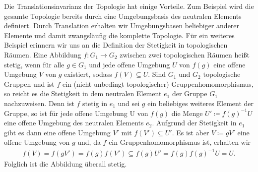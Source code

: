 	Die Translationsinvarianz der Topologie hat einige Vorteile.
	Zum Beispiel wird die gesamte Topologie bereits durch eine Umgebungsbasis des neutralen Elements definiert.
	Durch Translation erhalten wir Umgebungsbasen beliebiger anderer Elemente und damit zwangsläufig die komplette Topologie.
	Für ein weiteres Beispiel erinnern wir uns an die Definition der Stetigkeit in topologischen Räumen.
	Eine Abbildung $f: G_1 \to G_2$ zwischen zwei topologischen Räumen heißt stetig, wenn für alle $g\in G_1$ und jede offene Umgebung $U$ von $f(g)$ eine offene Umgebung $V$ von $g$ existiert, sodass $f(V)\subseteq U$.
	Sind $G_1$ und $G_2$ topologische Gruppen und ist $f$ ein (nicht unbedingt topologischer) Gruppenhomomorphismus, so reicht es die Stetigkeit in dem neutralen Element $e_1$ der Gruppe $G_1$ nachzuweisen.
	Denn ist $f$ stetig in $e_1$ und sei $g$ ein beliebiges weiteres Element der Gruppe, so ist für jede offene Umgebung U von $f(g)$ die Menge $U'\coloneqq f(g)^{-1}U$ eine offene Umgebung des neutralen Elements $e_2$. 
	Aufgrund der Stetigkeit in $e_1$ gibt es dann eine offene Umgebung $V'$ mit $f(V') \subseteq U'$.
	Es ist aber $V\coloneqq gV'$ eine offene Umgebung von $g$ und, da $f$ ein Gruppenhomomorphismus ist, erhalten wir
	\begin{align*}
		f(V) = f(gV') = f(g)f(V') \subseteq f(g) U' =f(g)f(g)^{-1} U = U.
	\end{align*}
	Folglich ist die Abbildung überall stetig.
	
